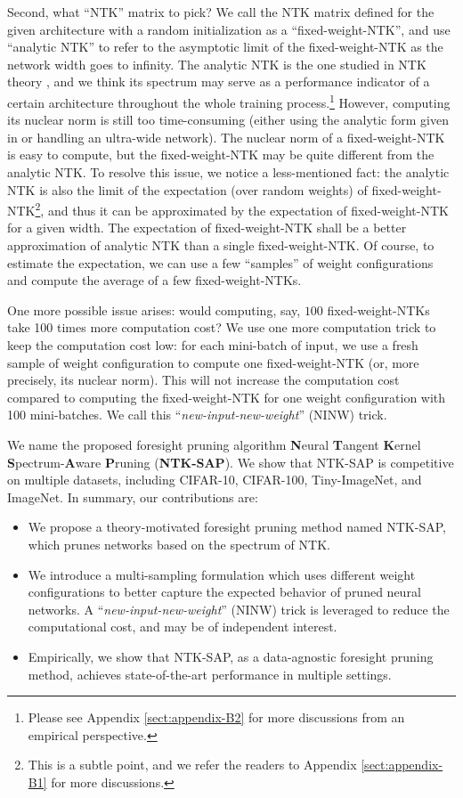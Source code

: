 \documentclass{article} %
\begin{document}
Second, what ``NTK'' matrix to pick? We call the NTK matrix defined for the given architecture with a random initialization as a ``fixed-weight-NTK'', and use ``analytic NTK'' \citep{jacot2018ntk} to refer to the asymptotic limit of the fixed-weight-NTK as the network width goes to infinity. The analytic NTK is the one studied in NTK theory  \citep{jacot2018ntk}, and we think its spectrum may serve as a performance indicator of a certain architecture throughout the whole training process.\footnote{Please see Appendix \ref{sect:appendix-B2} for more discussions from an empirical perspective.} However, computing its nuclear norm is still too time-consuming (either using the analytic form given in \citet{jacot2018ntk} or handling an ultra-wide network). The nuclear norm of a fixed-weight-NTK is easy to compute,
but the fixed-weight-NTK may be quite different from the analytic NTK. To resolve this issue, we notice a less-mentioned fact: the analytic NTK is also the limit of the expectation (over random weights) of fixed-weight-NTK\footnote{This is a subtle point, and we refer the readers to Appendix \ref{sect:appendix-B1} for more discussions.}, and thus it can be approximated by the expectation of fixed-weight-NTK for a given width. The expectation of fixed-weight-NTK shall be a better approximation of analytic NTK than a single fixed-weight-NTK. Of course, to estimate the expectation, we can use a few ``samples'' of weight configurations and compute the average of a few fixed-weight-NTKs. 

One more possible issue arises: would computing, say, $100$ fixed-weight-NTKs take 100 times more computation cost? We use one more computation trick to keep the computation cost low: for each mini-batch of input, we use a fresh sample of weight configuration to compute one fixed-weight-NTK (or, more precisely, its nuclear norm). This will not increase the computation cost compared to computing the fixed-weight-NTK for one weight configuration with 100 mini-batches. We call this ``\textit{new-input-new-weight}'' (NINW) trick.

We name the proposed foresight pruning algorithm \textbf{N}eural \textbf{T}angent \textbf{K}ernel \textbf{S}pectrum-\textbf{A}ware \textbf{P}runing (\textbf{NTK-SAP}). We show that NTK-SAP is competitive on multiple datasets, including CIFAR-10, CIFAR-100, Tiny-ImageNet, and ImageNet. In summary, our contributions are:
\begin{itemize}
    \item 
    We propose a theory-motivated foresight pruning method named NTK-SAP, which prunes networks based on the spectrum of NTK. 
  \item We introduce a multi-sampling formulation 
 which uses different weight configurations to better capture the expected behavior of pruned neural networks. A ``\textit{new-input-new-weight}'' (NINW) trick is leveraged to reduce the computational cost, and may be of independent interest. 
    \item Empirically, we show that NTK-SAP, as a data-agnostic foresight pruning method, achieves state-of-the-art performance in multiple settings. 
    
\end{itemize}
\end{document}
